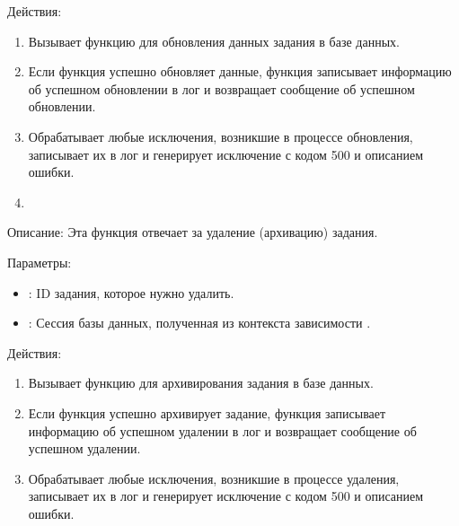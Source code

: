 \documentclass[letterpaper,10pt,russian]{sphinxmanual}
\begin{document}
\sphinxAtStartPar
Действия:
\begin{enumerate}
%
\item {} 
\sphinxAtStartPar
Вызывает функцию  для обновления данных задания в базе данных.

\item {} 
\sphinxAtStartPar
Если функция  успешно обновляет данные, функция записывает информацию об успешном обновлении в лог и возвращает сообщение об успешном обновлении.

\item {} 
\sphinxAtStartPar
Обрабатывает любые исключения, возникшие в процессе обновления, записывает их в лог и генерирует исключение  с кодом 500 и описанием ошибки.

\item {} 
\sphinxAtStartPar
{}

\end{enumerate}

\sphinxAtStartPar
Описание: Эта функция отвечает за удаление (архивацию) задания.

\sphinxAtStartPar
Параметры:
\begin{itemize}
\item {} 
\sphinxAtStartPar
{}: ID задания, которое нужно удалить.

\item {} 
\sphinxAtStartPar
{}: Сессия базы данных, полученная из контекста зависимости .

\end{itemize}

\sphinxAtStartPar
Действия:
\begin{enumerate}
%
\item {} 
\sphinxAtStartPar
Вызывает функцию  для архивирования задания в базе данных.

\item {} 
\sphinxAtStartPar
Если функция  успешно архивирует задание, функция записывает информацию об успешном удалении в лог и возвращает сообщение об успешном удалении.

\item {} 
\sphinxAtStartPar
Обрабатывает любые исключения, возникшие в процессе удаления, записывает их в лог и генерирует исключение  с кодом 500 и описанием ошибки.

\end{enumerate}
\end{document}
